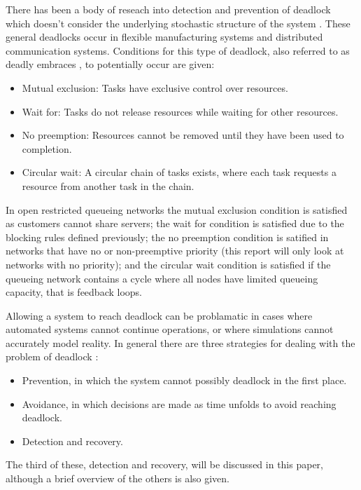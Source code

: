 \documentclass{article}
\numberwithin{equation}{section}
\begin{document}
There has been a body of reseach into detection and prevention of deadlock which doesn't consider the underlying stochastic structure of the system \cite{coffmanelphick71}.
These general deadlocks occur in flexible manufacturing systems and distributed communication systems.
Conditions for this type of deadlock, also referred to as deadly embraces \cite{coffmanelphick71}, to potentially occur are given:
\begin{itemize}
  \item Mutual exclusion: Tasks have exclusive control over resources.
  \item Wait for: Tasks do not release resources while waiting for other resources.
  \item No preemption: Resources cannot be removed until they have been used to completion.
  \item Circular wait: A circular chain of tasks exists, where each task requests a resource from another task in the chain.
\end{itemize}

In open restricted queueing networks the mutual exclusion condition is satisfied as customers cannot share servers; the wait for condition is satisfied due to the blocking rules defined previously; the no preemption condition is satified in networks that have no or non-preemptive priority (this report will only look at networks with no priority); and the circular wait condition is satisfied if the queueing network contains a cycle where all nodes have limited queueing capacity, that is feedback loops.

Allowing a system to reach deadlock can be problamatic in cases where automated systems cannot continue operations, or where simulations cannot accurately model reality.
In general there are three strategies for dealing with the problem of deadlock \cite{kawadkaretal14, elmagarmid86}:

\begin{itemize}
  \item Prevention, in which the system cannot possibly deadlock in the first place.
  \item Avoidance, in which decisions are made as time unfolds to avoid reaching deadlock.
  \item Detection and recovery.
\end{itemize}

The third of these, detection and recovery, will be discussed in this paper, although a brief overview of the others is also given.
\end{document}
